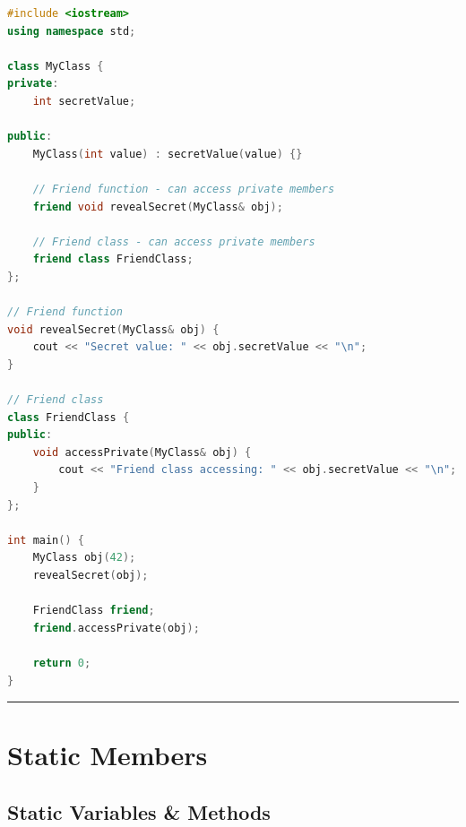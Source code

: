 \begin{lstlisting}[language={C++}]
#include <iostream>
using namespace std;

class MyClass {
private:
    int secretValue;
    
public:
    MyClass(int value) : secretValue(value) {}
    
    // Friend function - can access private members
    friend void revealSecret(MyClass& obj);
    
    // Friend class - can access private members
    friend class FriendClass;
};

// Friend function
void revealSecret(MyClass& obj) {
    cout << "Secret value: " << obj.secretValue << "\n";
}

// Friend class
class FriendClass {
public:
    void accessPrivate(MyClass& obj) {
        cout << "Friend class accessing: " << obj.secretValue << "\n";
    }
};

int main() {
    MyClass obj(42);
    revealSecret(obj);
    
    FriendClass friend;
    friend.accessPrivate(obj);
    
    return 0;
}
\end{lstlisting}

\begin{center}\rule{0.5\linewidth}{0.5pt}\end{center}

\hypertarget{static-members}{%
\section{Static Members}\label{static-members}}

\hypertarget{static-variables-methods}{%
\subsection{Static Variables \&
Methods}\label{static-variables-methods}}

